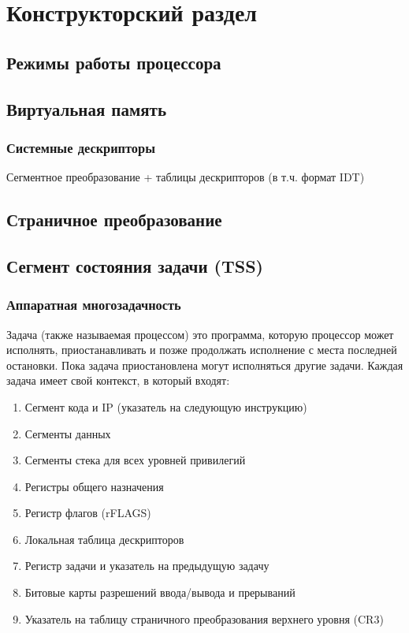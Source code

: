 \chapter{Конструкторский раздел}
\label{cha:design}

\section{Режимы работы процессора}

\section{Виртуальная память}
\subsection{Системные дескрипторы}
\label{subsec:system_desriptor_format}

Сегментное преобразование + таблицы дескрипторов (в т.ч. формат IDT)

\section{Страничное преобразование}

\section{Сегмент состояния задачи (TSS)}
\subsection{Аппаратная многозадачность}
Задача (также называемая процессом) это программа, которую процессор может
исполнять, приостанавливать и позже продолжать исполнение с места последней
остановки. Пока задача приостановлена могут исполняться другие задачи. Каждая
задача имеет свой контекст, в который входят:
\begin{enumerate}
\item Сегмент кода и IP (указатель на следующую инструкцию)
\item Сегменты данных
\item Сегменты стека для всех уровней привилегий
\item Регистры общего назначения
\item Регистр флагов (rFLAGS)
\item Локальная таблица дескрипторов
\item Регистр задачи и указатель на предыдущую задачу
\item Битовые карты разрешений ввода/вывода и прерываний
\item Указатель на таблицу страничного преобразования верхнего уровня (CR3)
\end{enumerate}

